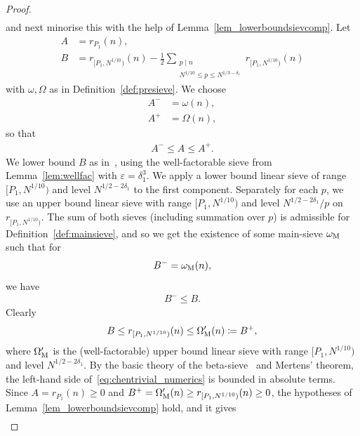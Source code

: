 \documentclass[12pt]{amsart}
\theoremstyle{definition}
\theoremstyle{remark}
\numberwithin{equation}{section}
\newcommand{\1}{\mathbf{1}}
\begin{document}
\begin{proof}
\begin{align*}
    \end{align*}
    and next minorise this with the help of Lemma~\ref{lem_lowerboundsievcomp}. Let
    \begin{align*}
        A&=r_{P_1}(n),\\
        B&=r_{[P_1,N^{1/10})}(n)-\frac{1}{2}\sum_{\substack{p\mid n \\ N^{1/10}\leq p \leq N^{1/3-\delta_1}}}r_{[P_1,N^{1/10})}(n)
    \end{align*}
    with $\omega, \Omega$ as in Definition~\ref{def:presieve}. We choose
    \begin{align*}
        A^-&=\omega(n),\\
        A^+&=\Omega(n),
    \end{align*}
    so that 
    \begin{align*}
        A^-\leq A \leq A^+.
    \end{align*}
    We lower bound $B$ as in~\cite[Appendix A.3]{matomaki-shao}, using the well-factorable sieve from Lemma~\ref{lem:wellfac} with $\varepsilon=\delta_1^3$. We apply a lower bound linear sieve of range $[P_1,N^{1/10})$ and level $N^{1/2-2\delta_1}$ to the first component. Separately for each $p$, we use an upper bound linear sieve with range $[P_1,N^{1/10})$ and level $N^{1/2-2\delta_1}/p$ on $r_{[P_1,N^{1/10})}$. The sum of both sieves (including summation over $p$) is admissible for Definition~\ref{def:mainsieve}, and so we get the existence of some main-sieve $\omega_{\textup{M}}$ such that for
    \begin{align*}
        B^-=\omega_{\textup{M}}(n),
    \end{align*}
 we have
    \begin{align*}
        B^-\leq B.
    \end{align*}
    Clearly
    \begin{align*}
        B\leq r_{[P_1,N^{1/10})}(n)\leq \Omega'_{\textnormal{M}}(n)\coloneqq B^+,
    \end{align*}
    where $\Omega'_{\textnormal{M}}$ is the (well-factorable) upper bound linear sieve with range $[P_1,N^{1/10})$ and level $N^{1/2-2\delta_1}$. By the basic theory of the beta-sieve~\cite[Theorem 11.12]{cribro} and Mertens' theorem, the left-hand side of~\eqref{eq:chentrivial_numerics} is bounded in absolute terms. 
    Since $A=r_{P_1}(n)\geq0$ and $B^+=\Omega'_{\textnormal{M}}(n)\geq r_{[P_1,N^{1/10})}(n)\geq0$, the hypotheses of Lemma~\ref{lem_lowerboundsievcomp} hold, and it gives
    \begin{align}\label{eq:3.9firstlower}

\end{align}
\end{proof}
\end{document}
